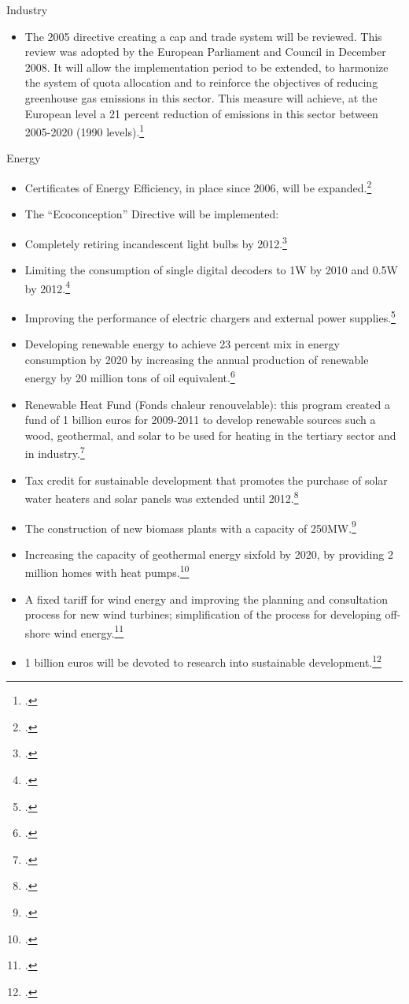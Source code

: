 Industry
\begin{itemize}
	\item The 2005 directive creating a cap and trade system will be reviewed. This review was adopted by the European Parliament and Council in December 2008. It will allow the implementation period to be extended, to harmonize the system of quota allocation and to reinforce the objectives of reducing greenhouse gas emissions in this sector. This measure will achieve, at the European level a 21 percent reduction of emissions in this sector between 2005-2020 (1990 levels).\footcite[][]{GrenellePolicies}
\end{itemize}



Energy
\begin{itemize}
	\item Certificates of Energy Efficiency, in place since 2006, will be expanded.\footcite[][]{GrenellePolicies}
	\item The “Ecoconception” Directive will be implemented:
	\item Completely retiring incandescent light bulbs by 2012.\footcite[][]{GrenellePolicies}
	\item Limiting the consumption of single digital decoders to 1W by 2010 and 0.5W by 2012.\footcite[][]{GrenellePolicies}
	\item Improving the performance of electric chargers and external power supplies.\footcite[][]{GrenellePolicies}
	\item Developing renewable energy to achieve 23 percent mix in energy consumption by 2020 by increasing the annual production of renewable energy by 20 million tons of oil equivalent.\footcite[][]{GrenellePolicies}
	\item Renewable Heat Fund (Fonds chaleur renouvelable): this program created a fund of 1 billion euros for 2009-2011 to develop renewable sources such a wood, geothermal, and solar to be used for heating in the tertiary sector and in industry.\footcite[][]{GrenellePolicies}
	\item Tax credit for sustainable development that promotes the purchase of solar water heaters and solar panels was extended until 2012.\footcite[][]{GrenellePolicies}
	\item The construction of new biomass plants with a capacity of 250MW.\footcite[][]{GrenellePolicies}
	\item Increasing the capacity of geothermal energy sixfold by 2020, by providing 2 million homes with heat pumps.\footcite[][]{GrenellePolicies}
	\item A fixed tariff for wind energy and improving the planning and consultation process for new wind turbines; simplification of the process for developing off-shore wind energy.\footcite[][]{GrenellePolicies}
	\item 1 billion euros will be devoted to research into sustainable development.\footcite[][]{GrenellePolicies} 
\end{itemize}



